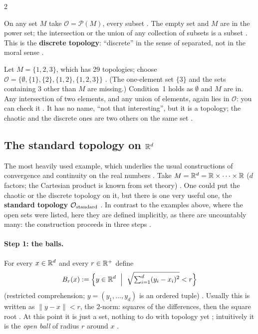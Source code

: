\begin{paracol}{2}
\begin{example}\label{ex:to-discrete}
On any set $M$ take $\mathcal O=\mathcal P(M)$, every subset . The empty set and $M$ are
in the power set; the intersection or the union of any collection of subsets is a subset .
This is the \textbf{discrete topology}: ``discrete'' in the sense of separated, not in the moral sense
.
\end{example}

\begin{example}\label{ex:to-three}
Let $M=\{1,2,3\}$, which has 29 topologies; choose
$\mathcal O=\bigl\{\emptyset,\{1\},\{2\},\{1,2\},\{1,2,3\}\bigr\}$ . (The one-element set $\{3\}$ and
the sets containing $3$ other than $M$ are missing.) Condition~1 holds as $\emptyset$ and $M$ are in. Any intersection of
two elements, and any union of elements, again lies in $\mathcal O$: you can check it .
It has no name, ``not that interesting'', but it is a topology; the chaotic and the discrete ones are two others on the same
set .
\end{example}

\subsection{The standard topology on $\mathbb{R}^d$}\label{sec:to-standard}

The most heavily used example, which underlies the usual constructions of convergence and continuity on the real
numbers . Take $M=\mathbb{R}^d=\mathbb{R}\times\dots\times\mathbb{R}$ ($d$ factors; the Cartesian product is known
from set theory) . One could put the chaotic or the discrete topology on it, but there is
one very useful one, the \textbf{standard topology} $\mathcal O_{\rm standard}$ . In contrast to the
examples above, where the open sets were listed, here they are defined implicitly, as there are uncountably many: the
construction proceeds in three steps .

\paragraph{Step 1: the balls.} For every $x\in\mathbb{R}^d$ and every $r\in\mathbb{R}^+$ define
\[
  B_r(x):=\Bigl\{y\in\R^d\ \Bigm|\ \sqrt{\textstyle\sum_{i=1}^d (y_i-x_i)^2}<r\Bigr\}
\]
(restricted comprehension; $y=(y_1,\dots,y_d)$ is an ordered tuple) .
Usually this is written as $\|y-x\|<r$, the $2$-norm: squares of the differences, then the square root
. At this point it is just a set, nothing to do with topology yet ; intuitively it is the
\emph{open ball} of radius $r$ around $x$ .


\end{paracol}
